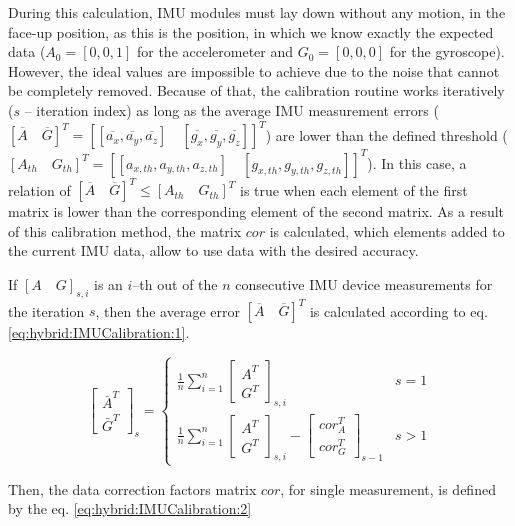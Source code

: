 \documentclass[sensors,article,submit,moreauthors,pdftex,10pt,a4paper]{mdpi}
\begin{document}
During this calculation, IMU modules must lay down without any motion, in the face-up position, as this is the position, in which we know exactly the expected data ($A_0=[0,0,1]$ for the accelerometer and $G_0=[0,0,0]$ for the gyroscope). However, the ideal values are impossible to achieve due to the noise that cannot be completely removed. Because of that, the calibration routine works iteratively ($s$ -- iteration index) as long as the average IMU measurement errors ($[\overline{A}\quad \overline{G}]^T = [[\overline{a_x},\overline{a_y},\overline{a_z}]\quad[\overline{g_x},\overline{g_y},\overline{g_z}]]^T$) are lower than the defined threshold ($[A_{th}\quad G_{th}]^T = [[a_{x,th},a_{y,th},a_{z,th}]\quad[g_{x,th},g_{y,th},g_{z,th}]]^T$). In this case, a relation of $[\overline{A}\quad \overline{G}]^T \le [A_{th}\quad G_{th}]^T$ is true when each element of the first matrix is lower than the corresponding element of the second matrix. As a result of this calibration method, the matrix $cor$ is calculated, which elements added to the current IMU data, allow to use data with the desired accuracy. 
		
If $[A\quad G]_{s,i}$ is an $i$--th out of the $n$ consecutive IMU device measurements for the iteration $s$, then the average error $[\overline{A}\quad \overline{G}]^T$ is calculated according to eq. \ref{eq:hybrid:IMUCalibration:1}.
		
\begin{equation}
	\begin{bmatrix} \bar{A}^T \\ \bar{G}^T \end{bmatrix}_s =
	\begin{cases}
		\frac{1}{n}\sum_{i=1}^{n}{\begin{bmatrix}A^T \\ G^T\end{bmatrix}_{s,i}} & s = 1\\
		\frac{1}{n}\sum_{i=1}^{n}{\begin{bmatrix}A^T \\ G^T\end{bmatrix}_{s,i} - \begin{bmatrix}cor_A^T\\ cor_G^T\end{bmatrix}_{s-1}} &  s > 1
	\end{cases}
	\label{eq:hybrid:IMUCalibration:1}
\end{equation}
	
Then, the data correction factors matrix $cor$, for single measurement, is defined by the eq. \ref{eq:hybrid:IMUCalibration:2}
		
\end{document}
